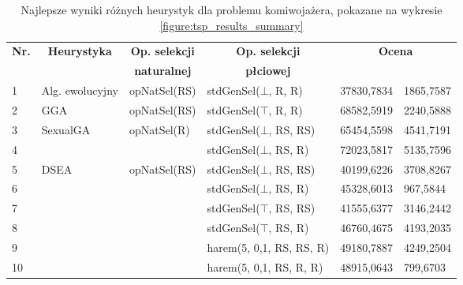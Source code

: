 \documentclass[./FM_mgr.tex]{subfiles}
\begin{document}
\begin{table}[H]
	\centering
	\caption{Najlepsze wyniki różnych heurystyk dla problemu komiwojażera, pokazane na wykresie \ref{figure:tsp_results_summary} \label{table:tsp_results_summary}}
	\begin{tabular}{|l|l|l|l|r@{$\pm$}l|}
		\hline
		\multicolumn{1}{|c|}{\multirow{2}{*}{{\bf Nr.}}} &\multicolumn{1}{c|}{\multirow{2}{*}{{\bf Heurystyka}}} & \multicolumn{1}{c|}{{\bf Op. selekcji}} & \multicolumn{1}{c|}{{\bf Op. selekcji}} & \multicolumn{2}{c|}{\multirow{2}{*}{{\bf Ocena}}} \\
		& \multicolumn{1}{c|}{}                                  & \multicolumn{1}{c|}{{\bf naturalnej}}          & \multicolumn{1}{c|}{{\bf płciowej}}        & \multicolumn{2}{c|}{}                             \\ \hline \hline
		1 & Alg. ewolucyjny                    & opNatSel(RS)                                          & stdGenSel($\bot$, R, R)                                 & 37830,7834      & 1865,7587      \\ \hline
		2 & GGA                                    & opNatSel(RS)                                          & stdGenSel($\top$, R, R)                                 & 68582,5919      & 2240,5888      \\ \hline
		3 & \multirow{2}{*}{SexualGA}              & \multirow{2}{*}{opNatSel(R)}                          & stdGenSel($\bot$, RS, RS)                               & 65454,5598      & 4541,7191      \\ \cline{1-1}\cline{4-6} 
		4 & &                                                       & stdGenSel($\bot$, RS, R)                                & 72023,5817      & 5135,7596      \\ \hline
		5 & \multirow{6}{*}{DSEA}                  & \multirow{6}{*}{opNatSel(RS)}                         & stdGenSel($\bot$, RS, RS)                               & 40199,6226      & 3708,8267      \\ \cline{1-1}\cline{4-6} 
		6 & &                                                       & stdGenSel($\bot$, RS, R)                                & 45328,6013      & 967,5844       \\ \cline{1-1}\cline{4-6} 
		7 & &                                                       & stdGenSel($\top$, RS, RS)                               & 41555,6377      & 3146,2442      \\ \cline{1-1}\cline{4-6} 
		8 & &                                                       & stdGenSel($\top$, RS, R)                                & 46760,4675      & 4193,2035      \\ \cline{1-1}\cline{4-6} 
		9 & &                                                       & harem(5, 0,1, RS, RS, R)                                & 49180,7887      & 4249,2504      \\ \cline{1-1}\cline{4-6} 
		10 & &                                                       & harem(5, 0,1, RS, R, R)                                 & 48915,0643      & 799,6703       \\ \hline
	\end{tabular}
\end{table}
\end{document}
